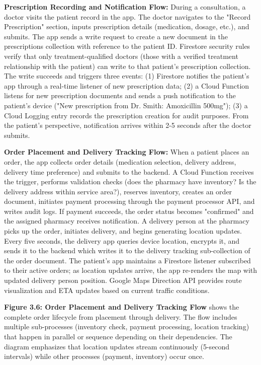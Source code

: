 \documentclass[12pt,a4paper]{report}
\begin{document}
\textbf{Prescription Recording and Notification Flow:} During a consultation, a doctor visits the patient record in the app. The doctor navigates to the "Record Prescription" section, inputs prescription details (medication, dosage, etc.), and submits. The app sends a write request to create a new document in the prescriptions collection with reference to the patient ID. Firestore security rules verify that only treatment-qualified doctors (those with a verified treatment relationship with the patient) can write to that patient's prescription collection. The write succeeds and triggers three events: (1) Firestore notifies the patient's app through a real-time listener of new prescription data; (2) a Cloud Function listens for new prescription documents and sends a push notification to the patient's device ("New prescription from Dr. Smith: Amoxicillin 500mg"); (3) a Cloud Logging entry records the prescription creation for audit purposes. From the patient's perspective, notification arrives within 2-5 seconds after the doctor submits.

\textbf{Order Placement and Delivery Tracking Flow:} When a patient places an order, the app collects order details (medication selection, delivery address, delivery time preference) and submits to the backend. A Cloud Function receives the trigger, performs validation checks (does the pharmacy have inventory? Is the delivery address within service area?), reserves inventory, creates an order document, initiates payment processing through the payment processor API, and writes audit logs. If payment succeeds, the order status becomes "confirmed" and the assigned pharmacy receives notification. A delivery person at the pharmacy picks up the order, initiates delivery, and begins generating location updates. Every five seconds, the delivery app queries device location, encrypts it, and sends it to the backend which writes it to the delivery tracking sub-collection of the order document. The patient's app maintains a Firestore listener subscribed to their active orders; as location updates arrive, the app re-renders the map with updated delivery person position. Google Maps Direction API provides route visualization and ETA updates based on current traffic conditions.

\textbf{Figure 3.6: Order Placement and Delivery Tracking Flow} shows the complete order lifecycle from placement through delivery. The flow includes multiple sub-processes (inventory check, payment processing, location tracking) that happen in parallel or sequence depending on their dependencies. The diagram emphasizes that location updates stream continuously (5-second intervals) while other processes (payment, inventory) occur once.
\end{document}
